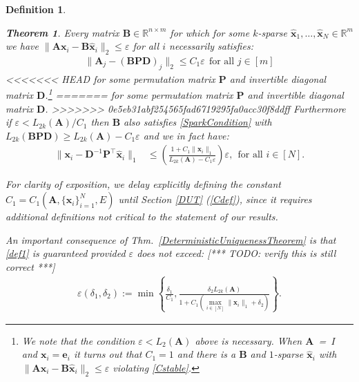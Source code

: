 \documentclass[9pt,twocolumn]{pnas-new}
\newtheorem{theorem}{Theorem}
\newtheorem{definition}{Definition}
\begin{document}
\begin{definition}
\begin{theorem}
Every matrix $\mathbf{B} \in \mathbb{R}^{n \times m}$ for which for some $k$-sparse $\mathbf{\hat x}_1, \ldots, \mathbf{\hat x}_N \in \mathbb{R}^{m}$ we have \mbox{$\|\mathbf{A}\mathbf{x}_i - \mathbf{B}\mathbf{\hat x}_i\|_2 \leq \varepsilon$} for all $i$ necessarily satisfies:
\begin{align}\label{Cstable}
\|\mathbf{A}_j-(\mathbf{B}\mathbf{PD})_j\|_2 \leq C_1 \varepsilon \ \ \text{for all $j \in [m]$}
\end{align}
%
<<<<<<< HEAD
for some permutation matrix $\mathbf{P}$ and invertible diagonal matrix $\mathbf{D}$.\footnote{We note that the condition $\varepsilon < L_2(\mathbf{A})$ above is necessary. When \mbox{$\mathbf{A}$ = $I$} and $\mathbf{x}_i = \mathbf{e}_i$ it turns out that $C_1 = 1$ and there is a $\mathbf{B}$ and $1$-sparse $\mathbf{\hat x}_i$ with $\|\mathbf{A}\mathbf{x}_i - \mathbf{B}\mathbf{\hat x}_i\|_2 \leq \varepsilon$ violating \eqref{Cstable}.}
=======
for some permutation matrix $\mathbf{P}$ and invertible diagonal matrix $\mathbf{D}$.
>>>>>>> 0e5eb31abf254565fad6719295fa0acc30f8ddff
Furthermore if $\varepsilon < L_{2k}(\mathbf{A}) / C_1$ then $\mathbf{B}$ also satisfies \eqref{SparkCondition} with $L_{2k}(\mathbf{B}\mathbf{PD}) \geq L_{2k}(\mathbf{A}) - C_1 \varepsilon$ and we in fact have:
\begin{align}\label{b-PDa}
\|\mathbf{x}_i - \mathbf{D}^{-1}\mathbf{P}^{\top}\mathbf{\hat x}_i\|_1 &\leq  \left( \frac{ 1+C_1 \|\mathbf{x}_i\|_1 }{ L_{2k}(\mathbf{A}) -  C_1\varepsilon } \right) \varepsilon,
 \ \ \text{for all $i \in [N]$}.
\end{align}
\end{theorem}

For clarity of exposition, we delay explicitly defining the constant $C_1 = C_1(\mathbf{A}, \{\mathbf{x}_i\}_{i=1}^N, E)$ until Section \ref{DUT} (\eqref{Cdef}), since it requires additional definitions not critical to the statement of our results.

An important consequence of Thm.~\ref{DeterministicUniquenessTheorem} is that \eqref{def1} is guaranteed provided $\varepsilon$ does not exceed: [*** TODO: verify this is still correct ***]
\begin{align}\label{epsdel}
\varepsilon(\delta_1, \delta_2) := \min \left\{ \frac{\delta_1}{ C_1 }, \frac{ \delta_2 L_{2k}(\mathbf{A})}{ 1 + C_1 \left( \max_{i \in [N]} \|\mathbf{x}_i\|_1  + \delta_2 \right) } \right\}.
\end{align}


\end{definition}
\end{document}
